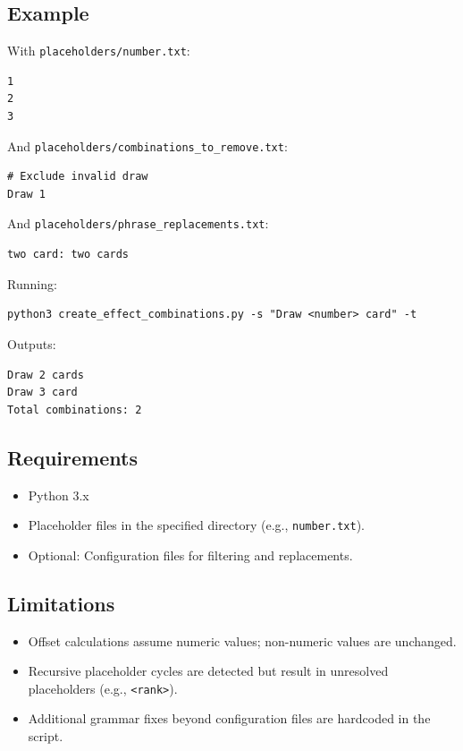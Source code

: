 \subsection{Example}
With \texttt{placeholders/number.txt}:
\begin{lstlisting}
1
2
3
\end{lstlisting}
And \texttt{placeholders/combinations\_to\_remove.txt}:
\begin{lstlisting}
# Exclude invalid draw
Draw 1
\end{lstlisting}
And \texttt{placeholders/phrase\_replacements.txt}:
\begin{lstlisting}
two card: two cards
\end{lstlisting}
Running:
\begin{lstlisting}[style=terminalstyle]
python3 create_effect_combinations.py -s "Draw <number> card" -t
\end{lstlisting}
Outputs:
\begin{lstlisting}
Draw 2 cards
Draw 3 card
Total combinations: 2
\end{lstlisting}

\subsection{Requirements}
\begin{itemize}
    \item Python 3.x
    \item Placeholder files in the specified directory (e.g., \texttt{number.txt}).
    \item Optional: Configuration files for filtering and replacements.
\end{itemize}

\subsection{Limitations}
\begin{itemize}
    \item Offset calculations assume numeric values; non-numeric values are unchanged.
    \item Recursive placeholder cycles are detected but result in unresolved placeholders (e.g., \texttt{<rank>}).
    \item Additional grammar fixes beyond configuration files are hardcoded in the script.
\end{itemize}








